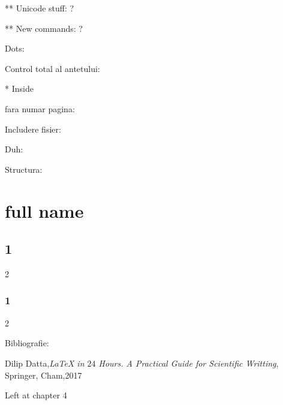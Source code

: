** Unicode stuff: ?
\usepackage[utf8]{inputenc}

** New commands: ?
\newcommand{\lab}[1]{
  \section*{Laborator #1}
  \addcontentsline{toc}{section}{Laborator #1}
}

\usepackage{xparse}

Dots:
\usepackage{tocloft}

\renewcommand{\cftchapleader}{\cftdotfill{\cftdotsep}}

Control total al antetului:
\pagestyle{fancy}


* Inside



fara numar pagina:
\thispagestyle{empty}

Includere fisier:


Duh:
\tableofcontents
\maketitle


\newpage

Structura:
\chapter[TOC name]{full name}
\section{1}{2}
\subsection{1}{2}

\printindex
\clearpage

Bibliografie:
\begin{thebibliography}{99}
     Dilip Datta,\textit{\LaTeX{} in $24$ Hours. A Practical Guide for Scientific Writting}, Springer, Cham,2017

\end{thebibliography}

Left at chapter 4
